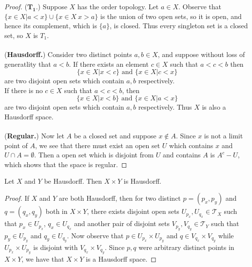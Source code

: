 \documentclass[a4paper,12pt,twoside]{hmcpset}
\begin{document}
\begin{proof}
    ($\mathbf{T_1.}$) Suppose $X$ has the order topology. 
    Let $a \in X$. Observe that $\{x \in X | a < x\} \cup \{x \in X \
    x > a\}$ is the union of two open sets, so it is open, and hence
    its complement, which is $\{a\}$, is closed. Thus every singleton
    set is a closed set, so $X$ is $T_1$.
    \\
    \\  
    (\textbf{Hausdorff.}) Consider two distinct
    points $a, b \in X$, and suppose without loss of generatlity that
    $a < b$. If there exists an element $c \in X$ such that $a < c < b$ then 
    \[
      \{x \in X | x < c\} \text{ and } \{x \in X | c < x\}  
    \]
    are two disjoint open sets which contain $a, b$ respectively.\\
    If there is no $c \in X$ such that $a < c < b$, then 
    \[
      \{x \in X | x < b\} \text{ and } \{x \in X | a < x\}  
    \]
    are two disjoint open sets which contain $a, b$ respectively.
    Thus $X$ is also a Hausdorff space.
    \\
    \\
    (\textbf{Regular.}) Now let $A$ be a closed set and suppose $x \notin A$. Since $x$ is
    not a limit point of $A$, we see that there must exist an open set
    $U$ which contains $x$ and $U \cap A = \emptyset$. Then a open set
    which is disjoint from $U$ and contains $A$ is $A^c - U$, which
    shows that the space is regular. 
\end{proof}

\begin{problem}[Theorem 5.16] Let $X$ and $Y$ be Hausdorff. Then $X
    \times Y$ is Hausdorff.
\end{problem}

\begin{proof}
    If $X$ and $Y$ are both Hausdorff, then for two distinct $p =
    (p_x, p_y)$ and $q = (q_x, q_y)$ both in $X \times Y$, there
    exists disjoint open sets $U_{p_x}, U_{q_x} \in \mathscr{T}_X$
    such that $p_x \in U_{p_x}$, $q_x \in U_{q_x}$ and another pair of
    disjoint sets $V_{p_y}, V_{q_y} \in \mathscr{T}_Y$ such that $p_y
    \in U_{p_y}$ and $q_y \in U_{q_y}$. Now observe that $p \in
    U_{p_x} \times U_{p_y}$ and $q \in V_{q_x} \times V_{q_y}$ while
    $U_{p_x} \times U_{p_y}$ is disjoint with $V_{q_x} \times
    V_{q_y}$. Since $p, q$ were arbitrary distinct points in $X \times
    Y$, we have that $X \times Y$ is a Hausdorff space. 
\end{proof}
\end{document}
